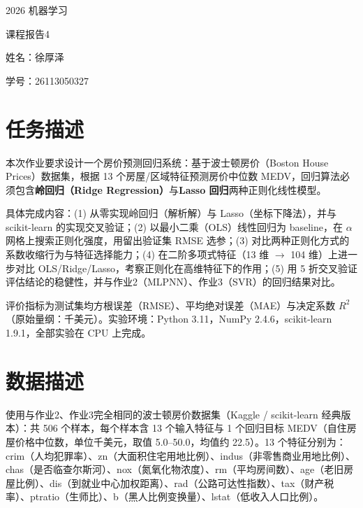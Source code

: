\documentclass[UTF8,zihao=-4]{ctexart}
\newcommand{\ReportCourse}{2026 机器学习}
\newcommand{\ReportNo}{4}
\newcommand{\ReportName}{徐厚泽}
\newcommand{\ReportStudentID}{26113050327}
\begin{document}
\begin{titlepage}
  \centering
  \vspace*{1.2cm}
  {\heiti{}\ReportCourse\par}
  \vspace{1.5em}
  {\heiti{}课程报告\ReportNo\par}
  \vfill
  {\kaishu{}姓名：\ReportName\par}
  \vspace{0.8em}
  {\kaishu{}学号：\ReportStudentID\par}
  \vfill
\end{titlepage}

\section{任务描述}
本次作业要求设计一个房价预测回归系统：基于波士顿房价（Boston House Prices）数据集，根据 13 个房屋/区域特征预测房价中位数 MEDV，回归算法必须包含\textbf{岭回归（Ridge Regression）}与\textbf{Lasso 回归}两种正则化线性模型。

具体完成内容：(1) 从零实现岭回归（解析解）与 Lasso（坐标下降法），并与 scikit-learn 的实现交叉验证；(2) 以最小二乘（OLS）线性回归为 baseline，在 $\alpha$ 网格上搜索正则化强度，用留出验证集 RMSE 选参；(3) 对比两种正则化方式的系数收缩行为与特征选择能力；(4) 在二阶多项式特征（13 维 $\to$ 104 维）上进一步对比 OLS/Ridge/Lasso，考察正则化在高维特征下的作用；(5) 用 5 折交叉验证评估结论的稳健性，并与作业2（MLPNN）、作业3（SVR）的回归结果对比。

评价指标为测试集均方根误差（RMSE）、平均绝对误差（MAE）与决定系数 $R^2$（原始量纲：千美元）。实验环境：Python 3.11，NumPy 2.4.6，scikit-learn 1.9.1，全部实验在 CPU 上完成。

\section{数据描述}
使用与作业2、作业3完全相同的波士顿房价数据集（Kaggle / scikit-learn 经典版本）：共 506 个样本，每个样本含 13 个输入特征与 1 个回归目标 MEDV（自住房屋价格中位数，单位千美元，取值 5.0--50.0，均值约 22.5）。13 个特征分别为：crim（人均犯罪率）、zn（大面积住宅用地比例）、indus（非零售商业用地比例）、chas（是否临查尔斯河）、nox（氮氧化物浓度）、rm（平均房间数）、age（老旧房屋比例）、dis（到就业中心加权距离）、rad（公路可达性指数）、tax（财产税率）、ptratio（生师比）、b（黑人比例变换量）、lstat（低收入人口比例）。
\end{document}
